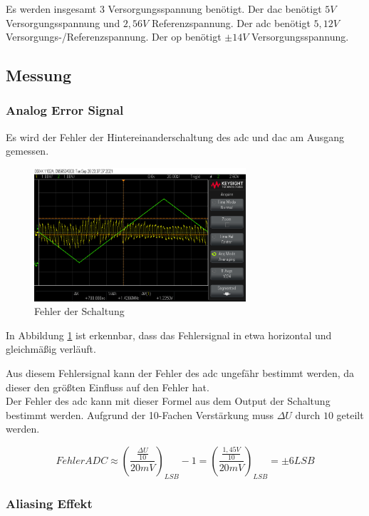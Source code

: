 \documentclass[12pt, a4paper, ngerman]{article}
\begin{document}
Es werden insgesamt 3 Versorgungsspannung benötigt.
Der \ac{dac} benötigt $5V$ Versorgungsspannung und $2,56V$ Referenzspannung.
Der \ac{adc} benötigt $5,12V$ Versorgungs-/Referenzspannung.
Der \ac{op} benötigt $\pm 14V$ Versorgungsspannung.


\subsection{Messung}

\subsubsection{Analog Error Signal}

Es wird der Fehler der Hintereinanderschaltung des \ac{adc} und \ac{dac} am Ausgang gemessen.

\begin{figure}
  \centering
  \includegraphics[width=0.7\textwidth]{scope_38.png}
  \caption{Fehler der Schaltung}
  \label{plot:fehler1}
\end{figure}

In Abbildung \ref{plot:fehler1} ist erkennbar,
dass das Fehlersignal in etwa horizontal und gleichmäßig verläuft.

Aus diesem Fehlersignal kann der Fehler des \ac{adc} ungefähr bestimmt werden,
da dieser den größten Einfluss auf den Fehler hat. \\
Der Fehler des \ac{adc} kann mit dieser Formel aus dem Output der Schaltung bestimmt werden.
Aufgrund der 10-Fachen Verstärkung muss $\Delta U$ durch $10$ geteilt werden.

$$
  Fehler ADC \approx (\frac{\frac{\Delta U}{10}}{20mV})_{LSB}-1 = (\frac{\frac{1,45V}{10}}{20mV})_{LSB} = \pm 6 LSB
$$

\subsubsection{Aliasing Effekt}
\end{document}
